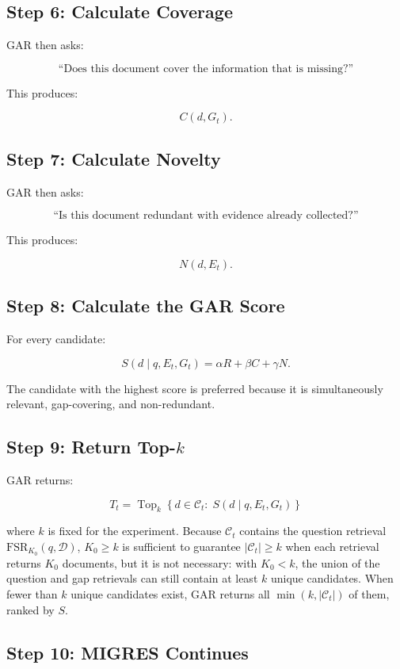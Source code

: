 \documentclass[11pt,a4paper]{article}
\begin{document}
\subsection{Step 6: Calculate Coverage}

GAR then asks:

\[
\text{``Does this document cover the information that is missing?''}
\]

This produces:

\[
C(d,G_t).
\]

\subsection{Step 7: Calculate Novelty}

GAR then asks:

\[
\text{``Is this document redundant with evidence already collected?''}
\]

This produces:

\[
N(d,E_t).
\]

\subsection{Step 8: Calculate the GAR Score}

For every candidate:

\[
S(d\mid q,E_t,G_t)
=
\alpha R+\beta C+\gamma N.
\]

The candidate with the highest score is preferred because it is simultaneously relevant, gap-covering, and non-redundant.

\subsection{Step 9: Return Top-$k$}

GAR returns:

\[
\boxed{
T_t=
\operatorname{Top}_{k}\!\left\{d\in\mathcal C_t:\;S(d\mid q,E_t,G_t)\right\}
}
\tag{10}
\]

where $k$ is fixed for the experiment. Because $\mathcal{C}_t$ contains the question retrieval $\mathrm{FSR}_{K_0}(q,\mathcal{D})$, $K_0\ge k$ is sufficient to guarantee $|\mathcal{C}_t|\ge k$ when each retrieval returns $K_0$ documents, but it is not necessary: with $K_0<k$, the union of the question and gap retrievals can still contain at least $k$ unique candidates. When fewer than $k$ unique candidates exist, GAR returns all $\min(k,|\mathcal{C}_t|)$ of them, ranked by $S$.

\subsection{Step 10: MIGRES Continues}
\end{document}
